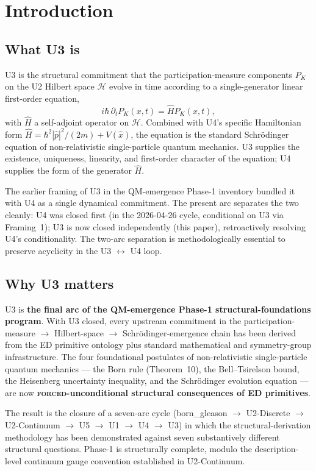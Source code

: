 \documentclass[11pt,a4paper]{article}
\begin{document}
\section{Introduction}

\subsection{What U3 is}

U3 is the structural commitment that the participation-measure components $P_K$ on the U2 Hilbert space $\mathcal{H}$ evolve in time according to a single-generator linear first-order equation,
\[
i\hbar \, \partial_t P_K(x, t) = \hat{H} P_K(x, t),
\]
with $\hat{H}$ a self-adjoint operator on $\mathcal{H}$. Combined with U4's specific Hamiltonian form $\hat{H} = \hbar^2|\hat{p}|^2/(2m) + V(\hat{x})$, the equation is the standard Schr\"odinger equation of non-relativistic single-particle quantum mechanics. U3 supplies the existence, uniqueness, linearity, and first-order character of the equation; U4 supplies the form of the generator $\hat{H}$.

The earlier framing of U3 in the QM-emergence Phase-1 inventory bundled it with U4 as a single dynamical commitment. The present arc separates the two cleanly: U4 was closed first (in the 2026-04-26 cycle, conditional on U3 via Framing~1); U3 is now closed independently (this paper), retroactively resolving U4's conditionality. The two-arc separation is methodologically essential to preserve acyclicity in the U3 $\leftrightarrow$ U4 loop.

\subsection{Why U3 matters}

U3 is \textbf{the final arc of the QM-emergence Phase-1 structural-foundations program}. With U3 closed, every upstream commitment in the participation-measure $\to$ Hilbert-space $\to$ Schr\"odinger-emergence chain has been derived from the ED primitive ontology plus standard mathematical and symmetry-group infrastructure. The four foundational postulates of non-relativistic single-particle quantum mechanics --- the Born rule (Theorem~10), the Bell--Tsirelson bound, the Heisenberg uncertainty inequality, and the Schr\"odinger evolution equation --- are now \textbf{\textsc{forced}-unconditional structural consequences of ED primitives}.

The result is the closure of a seven-arc cycle (born\_gleason $\to$ U2-Discrete $\to$ U2-Continuum $\to$ U5 $\to$ U1 $\to$ U4 $\to$ U3) in which the structural-derivation methodology has been demonstrated against seven substantively different structural questions. Phase-1 is structurally complete, modulo the description-level continuum gauge convention established in U2-Continuum.
\end{document}

